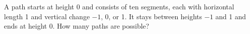A path starts at height 0 and consists of ten segments, each with horizontal length 1 and vertical change $-1 $, 0, or 1. It stays between heights $-1 $ and 1 and ends at height 0. How many paths are possible?
